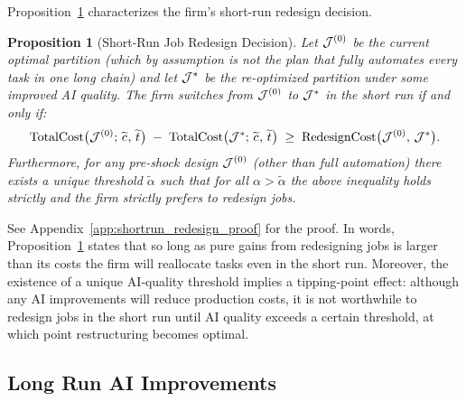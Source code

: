 \documentclass{article}
\theoremstyle{plain}
\theoremstyle{plain}
\newtheorem{proposition}{Proposition}
\begin{document}
Proposition~\ref{prop:shortrun_redesign} characterizes the firm’s short-run redesign decision.
\begin{proposition}[Short-Run Job Redesign Decision] 
\label{prop:shortrun_redesign}
Let $\mathcal{J}^{(0)}$ be the current optimal partition (which by assumption is not the plan that fully automates every task in one long chain) and let $\mathcal{J}^*$ be the re-optimized partition under some improved AI quality.
The firm switches from $\mathcal{J}^{(0)}$ to $\mathcal{J}^*$ in the short run if and only if:
\[
\mathrm{TotalCost}\bigl(\mathcal{J}^{(0)};\,\widetilde{c_{}},\,\widetilde{t_{}}\bigr)
\;-\;
\mathrm{TotalCost}\bigl(\mathcal{J}^*;\,\widetilde{c_{}},\,\widetilde{t_{}}\bigr)
\;\ge\;
\mathrm{RedesignCost}\bigl(\mathcal{J}^{(0)},\,\mathcal{J}^*\bigr).
\]
Furthermore, for any pre-shock design $\mathcal{J}^{(0)}$ (other than full automation) there exists a unique threshold $\tilde{\alpha}$ such that for all $\alpha>\tilde{\alpha}$ the above inequality holds strictly and the firm strictly prefers to redesign jobs.
\end{proposition}
See Appendix~\ref{app:shortrun_redesign_proof} for the proof.
In words, Proposition~\ref{prop:shortrun_redesign} states that so long as pure gains from redesigning jobs is larger than its costs the firm will reallocate tasks even in the short run.
Moreover, the existence of a unique AI‐quality threshold implies a tipping‐point effect: although any AI improvements will reduce production costs, it is not worthwhile to redesign jobs in the short run until AI quality exceeds a certain threshold, at which point restructuring becomes optimal. 


\subsection{Long Run AI Improvements}  
\end{document}

